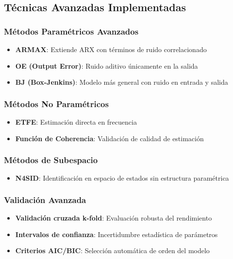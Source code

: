 \documentclass[a4paper,openright,9pt]{report}
\begin{document}
\subsection{Técnicas Avanzadas Implementadas}

\subsubsection{Métodos Paramétricos Avanzados}
\begin{itemize}
\item \textbf{ARMAX}: Extiende ARX con términos de ruido correlacionado
\item \textbf{OE (Output Error)}: Ruido aditivo únicamente en la salida
\item \textbf{BJ (Box-Jenkins)}: Modelo más general con ruido en entrada y salida
\end{itemize}

\subsubsection{Métodos No Paramétricos}
\begin{itemize}
\item \textbf{ETFE}: Estimación directa en frecuencia
\item \textbf{Función de Coherencia}: Validación de calidad de estimación
\end{itemize}

\subsubsection{Métodos de Subespacio}
\begin{itemize}
\item \textbf{N4SID}: Identificación en espacio de estados sin estructura paramétrica
\end{itemize}

\subsubsection{Validación Avanzada}
\begin{itemize}
\item \textbf{Validación cruzada k-fold}: Evaluación robusta del rendimiento
\item \textbf{Intervalos de confianza}: Incertidumbre estadística de parámetros
\item \textbf{Criterios AIC/BIC}: Selección automática de orden del modelo
\end{itemize}
\end{document}
